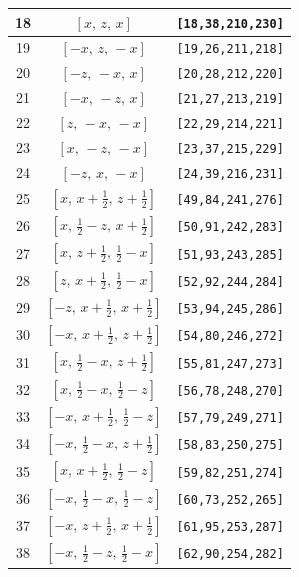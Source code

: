 \documentclass[fleqn,8pt]{jsarticle}
\begin{document}
\begin{longtable}{ccc}
18 & $\left[ x,\, z,\, x \right]$ & {\tt [18,38,210,230]} \\ \hline
19 & $\left[ - x,\, z,\, - x \right]$ & {\tt [19,26,211,218]} \\ \hline
20 & $\left[ - z,\, - x,\, x \right]$ & {\tt [20,28,212,220]} \\ \hline
21 & $\left[ - x,\, - z,\, x \right]$ & {\tt [21,27,213,219]} \\ \hline
22 & $\left[ z,\, - x,\, - x \right]$ & {\tt [22,29,214,221]} \\ \hline
23 & $\left[ x,\, - z,\, - x \right]$ & {\tt [23,37,215,229]} \\ \hline
24 & $\left[ - z,\, x,\, - x \right]$ & {\tt [24,39,216,231]} \\ \hline
25 & $\left[ x,\, x + \frac{1}{2},\, z + \frac{1}{2} \right]$ & {\tt [49,84,241,276]} \\ \hline
26 & $\left[ x,\, \frac{1}{2} - z,\, x + \frac{1}{2} \right]$ & {\tt [50,91,242,283]} \\ \hline
27 & $\left[ x,\, z + \frac{1}{2},\, \frac{1}{2} - x \right]$ & {\tt [51,93,243,285]} \\ \hline
28 & $\left[ z,\, x + \frac{1}{2},\, \frac{1}{2} - x \right]$ & {\tt [52,92,244,284]} \\ \hline
29 & $\left[ - z,\, x + \frac{1}{2},\, x + \frac{1}{2} \right]$ & {\tt [53,94,245,286]} \\ \hline
30 & $\left[ - x,\, x + \frac{1}{2},\, z + \frac{1}{2} \right]$ & {\tt [54,80,246,272]} \\ \hline
31 & $\left[ x,\, \frac{1}{2} - x,\, z + \frac{1}{2} \right]$ & {\tt [55,81,247,273]} \\ \hline
32 & $\left[ x,\, \frac{1}{2} - x,\, \frac{1}{2} - z \right]$ & {\tt [56,78,248,270]} \\ \hline
33 & $\left[ - x,\, x + \frac{1}{2},\, \frac{1}{2} - z \right]$ & {\tt [57,79,249,271]} \\ \hline
34 & $\left[ - x,\, \frac{1}{2} - x,\, z + \frac{1}{2} \right]$ & {\tt [58,83,250,275]} \\ \hline
35 & $\left[ x,\, x + \frac{1}{2},\, \frac{1}{2} - z \right]$ & {\tt [59,82,251,274]} \\ \hline
36 & $\left[ - x,\, \frac{1}{2} - x,\, \frac{1}{2} - z \right]$ & {\tt [60,73,252,265]} \\ \hline
37 & $\left[ - x,\, z + \frac{1}{2},\, x + \frac{1}{2} \right]$ & {\tt [61,95,253,287]} \\ \hline
38 & $\left[ - x,\, \frac{1}{2} - z,\, \frac{1}{2} - x \right]$ & {\tt [62,90,254,282]} \\ \hline

\end{longtable}
\end{document}
